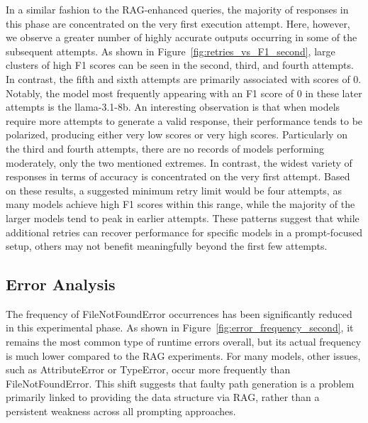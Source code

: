 \documentclass{DESSThesis}
\begin{document}
In a similar fashion to the RAG-enhanced queries, the majority of responses in this phase are concentrated on the very first execution attempt. Here, however, we observe a greater number of highly accurate outputs occurring in some of the subsequent attempts. As shown in Figure~\ref{fig:retries_vs_F1_second}, large clusters of high F1 scores can be seen in the second, third, and fourth attempts. In contrast, the fifth and sixth attempts are primarily associated with scores of 0. Notably, the model most frequently appearing with an F1 score of 0 in these later attempts is the llama-3.1-8b. An interesting observation is that when models require more attempts to generate a valid response, their performance tends to be polarized, producing either very low scores or very high scores. Particularly on the third and fourth attempts, there are no records of models performing moderately, only the two mentioned extremes. In contrast, the widest variety of responses in terms of accuracy is concentrated on the very first attempt. Based on these results, a suggested minimum retry limit would be four attempts, as many models achieve high F1 scores within this range, while the majority of the larger models tend to peak in earlier attempts. These patterns suggest that while additional retries can recover performance for specific models in a prompt-focused setup, others may not benefit meaningfully beyond the first few attempts.

\subsection{Error Analysis}

The frequency of FileNotFoundError occurrences has been significantly reduced in this experimental phase. As shown in Figure~\ref{fig:error_frequency_second}, it remains the most common type of runtime errors overall, but its actual frequency is much lower compared to the RAG experiments. For many models, other issues, such as AttributeError or TypeError, occur more frequently than FileNotFoundError. This shift suggests that faulty path generation is a problem primarily linked to providing the data structure via RAG, rather than a persistent weakness across all prompting approaches.
\end{document}
